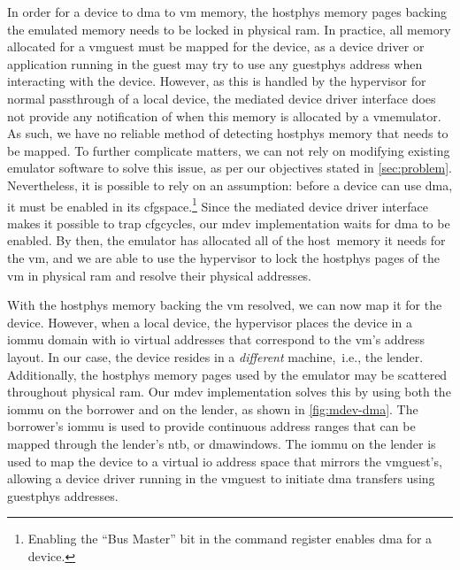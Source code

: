 In order for a device to \gls{dma} to \gls{vm} memory, the \gls{hostphys} memory pages backing the emulated memory needs to be locked in physical \gls{ram}.
%
In practice, all memory allocated for a \gls{vmguest} must be mapped for the device, as a device driver or application running in the \gls{guest} may try to use any \gls{guestphys} address when interacting with the device.
%
However, as this is handled by the \gls{hypervisor} for normal \gls{passthrough} of a local device, the mediated device driver interface does not provide any notification of when this memory is allocated by a \gls{vmemulator}.
%
As such, we have no reliable method of detecting \gls{hostphys} memory that needs to be mapped. %
%
To further complicate matters, we can not rely on modifying existing \gls{emulator} software to solve this issue, as per our objectives stated in \cref{sec:problem}.
%
Nevertheless, it is possible to rely on an assumption:
%
before a device can use \gls{dma}, it must be enabled in its \gls{cfgspace}.\footnote{Enabling the ``Bus Master'' bit in the command register enables \gls{dma} for a device.}
%
Since the mediated device driver interface makes it possible to \gls{trap} \glspl{cfgcycle}, our \gls{mdev} implementation waits for \gls{dma} to be enabled.
%
By then, the \gls{emulator} has allocated all of the \gls{host}~memory it needs for the \gls{vm}, and we are able to use the \gls{hypervisor} to lock the \gls{hostphys} pages of the \gls{vm} in physical \gls{ram} and resolve their physical addresses.



With the \gls{hostphys} memory backing the \gls{vm} resolved, we can now map it for the device.
%
However, when  a local device, the \gls{hypervisor} places the device in a \gls{iommu} domain with \gls{io} virtual addresses that correspond to the \gls{vm}'s address layout.
%
In our case, the device resides in a \emph{different} machine,~i.e., the \gls{lender}.
%
Additionally, the \gls{hostphys} memory pages used by the \gls{emulator} may be scattered throughout physical \gls{ram}.
%
Our \gls{mdev} implementation solves this by using both the \gls{iommu} on the \gls{borrower} and on the \gls{lender}, as shown in \cref{fig:mdev-dma}.
%
The \gls{borrower}'s \gls{iommu} is used to provide continuous address ranges that can be mapped through the \gls{lender}'s \gls{ntb}, or \glspl{dmawindow}.
%
The \gls{iommu} on the \gls{lender} is used to map the device to a virtual \gls{io} address space that mirrors the \gls{vmguest}'s, allowing a device driver running in the \gls{vmguest} to initiate \gls{dma} transfers using \gls{guestphys} addresses.



